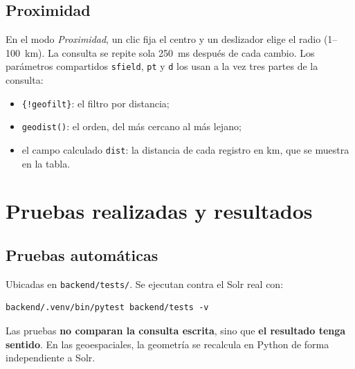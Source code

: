 \documentclass[11pt,a4paper]{article}
\newcommand{\cod}[1]{\texttt{#1}}
\begin{document}
\subsection{Proximidad}

En el modo \emph{Proximidad}, un clic fija el centro y un deslizador elige el radio
(1--100~km). La consulta se repite sola 250~ms después de cada cambio. Los parámetros
compartidos \cod{sfield}, \cod{pt} y \cod{d} los usan a la vez tres partes de la consulta:
\begin{itemize}
  \item \cod{\{!geofilt\}}: el filtro por distancia;
  \item \cod{geodist()}: el orden, del más cercano al más lejano;
  \item el campo calculado \cod{dist}: la distancia de cada registro en km, que se muestra
        en la tabla.
\end{itemize}

\section{Pruebas realizadas y resultados}
\label{sec:pruebas}

\subsection{Pruebas automáticas}

Ubicadas en \cod{backend/tests/}. Se ejecutan contra el Solr real con:
\begin{lstlisting}
backend/.venv/bin/pytest backend/tests -v
\end{lstlisting}

Las pruebas \textbf{no comparan la consulta escrita}, sino que \textbf{el resultado tenga
sentido}. En las geoespaciales, la geometría se recalcula en Python de forma independiente
a Solr.
\end{document}
